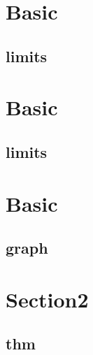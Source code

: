 \section{Basic}
    \subsection{limits}
        

\section{Basic}
    \subsection{limits}
        

\section{Basic}      
    \subsection{graph}
        
        
\section{Section2}
    \subsection{thm}
        